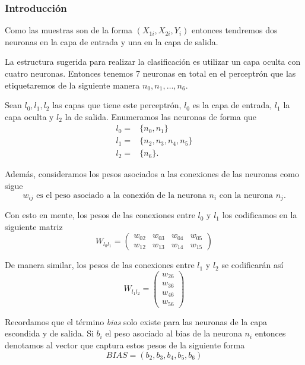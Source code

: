 \documentclass[11pt]{article}
\begin{document}
    \hypertarget{introducciuxf3n}{%
\subsubsection{Introducción}\label{introducciuxf3n}}

    Como las muestras son de la forma \((X_{1i},X_{2i},Y_i)\) entonces
tendremos dos neuronas en la capa de entrada y una en la capa de salida.

La estructura sugerida para realizar la clasificación es utilizar un
capa oculta con cuatro neuronas. Entonces tenemos 7 neuronas en total en
el perceptrón que las etiquetaremos de la siguiente manera
\(n_0,n_1,\dots,n_6\).

Sean \(l_0,l_1,l_2\) las capas que tiene este perceptrón, \(l_0\) es la
capa de entrada, \(l_1\) la capa oculta y \(l_2\) la de salida.
Enumeramos las neuronas de forma que \begin{align*}
    l_0=&\{n_0,n_1\}\\ 
    l_1=&\{n_2,n_3,n_4,n_5\}\\
    l_2=&\{n_6\}.
\end{align*}

    Además, consideramos los pesos asociados a las conexiones de las
neuronas como sigue \begin{equation*}
    w_{ij}\text{ es el peso asociado a la conexión de la neurona }n_i\text{ con la neurona }n_j.
\end{equation*}

Con esto en mente, los pesos de las conexiones entre \(l_0\) y \(l_1\)
los codificamos en la siguiente matriz
\begin{equation*}W_{l_0l_1}=\begin{pmatrix}w_{02}&w_{03}&w_{04}&w_{05}\\ w_{12} & w_{13} & w_{14} & w_{15} \end{pmatrix}
\end{equation*}

    De manera similar, los pesos de las conexiones entre \(l_1\) y \(l_2\)
se codificarán así
\begin{equation*}W_{l_1l_2}=\begin{pmatrix}w_{26}\\ w_{36} \\ w_{46} \\ w_{56}\end{pmatrix}\end{equation*}

    Recordamos que el término \emph{bias} solo existe para las neuronas de
la capa escondida y de salida. Si \(b_{i}\) el peso asociado al bias de
la neurona \(n_i\) entonces denotamos al vector que captura estos pesos
de la siguiente forma
\begin{equation*}BIAS=(b_2,b_3,b_4,b_5,b_6)\end{equation*}
\end{document}
